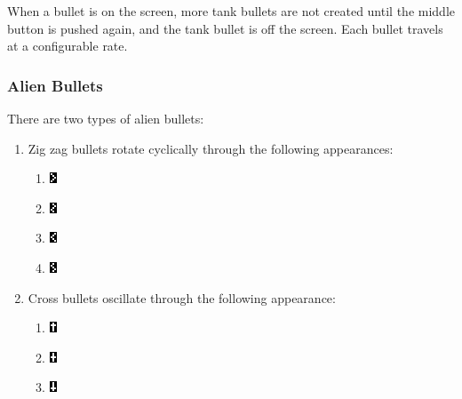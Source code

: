 \documentclass[11pt,letter,oneside]{report}
\begin{document}
When a bullet is on the screen, more tank bullets are not created until the middle button is pushed again, and the tank bullet is off the screen.  Each bullet travels at a configurable rate.

\subsubsection{Alien Bullets}
There are two types of alien bullets:
\begin{enumerate}
\item{}  Zig zag bullets rotate cyclically through the following appearances:

\begin{enumerate}
\item 
 \includegraphics[scale=2]{ZigBullet0.png}
\item 
 \includegraphics[scale=2]{ZigBullet1.png}
\item
 \includegraphics[scale=2]{ZigBullet2.png}
\item
 \includegraphics[scale=2]{ZigBullet3.png}
\end{enumerate}

\item{}  Cross bullets oscillate through the following appearance:

\begin{enumerate}
\item
 \includegraphics[scale=2]{TBullet0.png}
\item
 \includegraphics[scale=2]{TBullet1.png}
\item
 \includegraphics[scale=2]{TBullet2.png}
\end{enumerate}

\end{enumerate}
\end{document}
